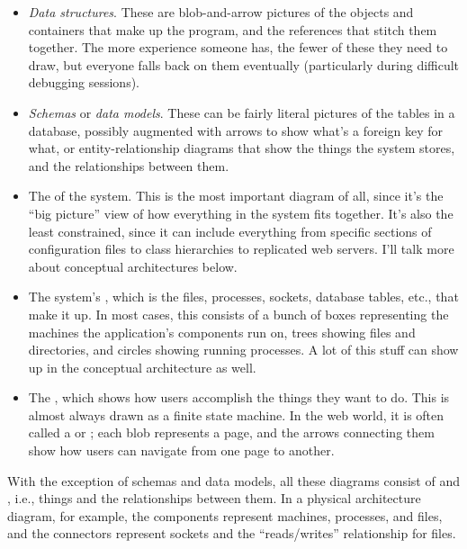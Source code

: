 \documentclass{report}
\begin{document}
\begin{itemize}

  \item \emph{Data structures}.  These are blob-and-arrow pictures of
  the objects and containers that make up the program, and the
  references that stitch them together.  The more experience someone
  has, the fewer of these they need to draw, but everyone falls back
  on them eventually (particularly during difficult debugging
  sessions).

  \item \emph{Schemas} or \emph{data models}.  These can be fairly
  literal pictures of the tables in a database, possibly augmented
  with arrows to show what's a foreign key for what, or
  entity-relationship diagrams that show the things the system stores,
  and the relationships between them.

  \item The  of the system.  This is
  the most important diagram of all, since it's the ``big picture''
  view of how everything in the system fits together.  It's also the
  least constrained, since it can include everything from specific
  sections of configuration files to class hierarchies to replicated
  web servers.  I'll talk more about conceptual architectures below.

  \item The system's , which is the
  files, processes, sockets, database tables, etc., that make it up.
  In most cases, this consists of a bunch of boxes representing the
  machines the application's components run on, trees showing files
  and directories, and circles showing running processes.  A lot of
  this stuff can show up in the conceptual architecture as well.

  \item The , which shows how users
  accomplish the things they want to do.  This is almost always drawn
  as a finite state machine.  In the web world, it is often called a
   or ; each blob
  represents a page, and the arrows connecting them show how users can
  navigate from one page to another.

\end{itemize}

With the exception of schemas and data models, all these diagrams
consist of  and , i.e., things
and the relationships between them.  In a physical architecture
diagram, for example, the components represent machines, processes,
and files, and the connectors represent sockets and the
``reads/writes'' relationship for files.
\end{document}
